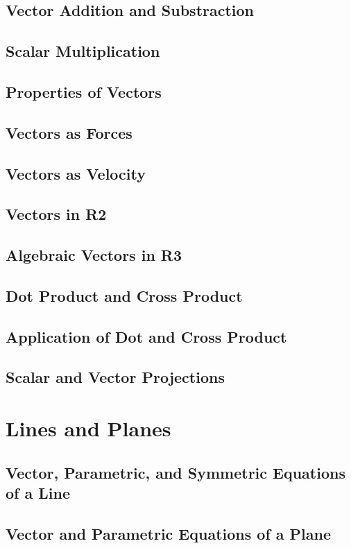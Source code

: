 \documentclass[12.5pt]{article}
\begin{document}
        \subsection{Vector Addition and Substraction}
        \subsection{Scalar Multiplication}
        \subsection{Properties of Vectors}
        \subsection{Vectors as Forces}
        \subsection{Vectors as Velocity}
        \subsection{Vectors in R2}
        \subsection{Algebraic Vectors in R3}
        \subsection{Dot Product and Cross Product}
        \subsection{Application of Dot and Cross Product}
        \subsection{Scalar and Vector Projections}

    \section{Lines and Planes}
        \subsection{Vector, Parametric, and Symmetric Equations of a Line}
        \subsection{Vector and Parametric Equations of a Plane}
\end{document}
